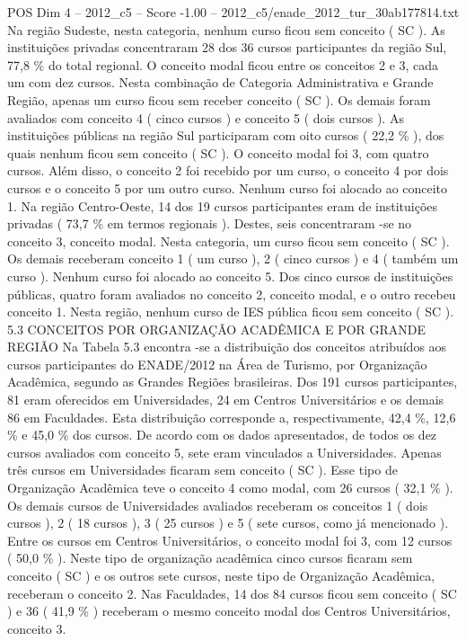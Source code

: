 \begin{textsample}{POS Dim 4 – 2012\_c5 – Score -1.00 – 2012\_c5/enade\_2012\_tur\_30ab177814.txt}
Na região Sudeste, nesta categoria, nenhum curso ficou sem conceito ( SC ).
As instituições privadas concentraram 28 dos 36 cursos participantes da região Sul, 77,8 \% do total regional.
O conceito modal ficou entre os conceitos 2 e 3, cada um com dez cursos.
Nesta combinação de Categoria Administrativa e Grande Região, apenas um curso ficou sem receber conceito ( SC ).
Os demais foram avaliados com conceito 4 ( cinco cursos ) e conceito 5 ( dois cursos ).
As instituições públicas na região Sul participaram com oito cursos ( 22,2 \% ), dos quais nenhum ficou sem conceito ( SC ).
O conceito modal foi 3, com quatro cursos.
Além disso, o conceito 2 foi recebido por um curso, o conceito 4 por dois cursos e o conceito 5 por um outro curso.
Nenhum curso foi alocado ao conceito 1.
Na região Centro-Oeste, 14 dos 19 cursos participantes eram de instituições privadas ( 73,7 \% em termos regionais ).
Destes, seis concentraram -se no conceito 3, conceito modal.
Nesta categoria, um curso ficou sem conceito ( SC ).
Os demais receberam conceito 1 ( um curso ), 2 ( cinco cursos ) e 4 ( também um curso ).
Nenhum curso foi alocado ao conceito 5.
Dos cinco cursos de instituições públicas, quatro foram avaliados no conceito 2, conceito modal, e o outro recebeu conceito 1.
Nesta região, nenhum curso de IES pública ficou sem conceito ( SC ). 5.3 CONCEITOS POR ORGANIZAÇÃO ACADÊMICA E POR GRANDE REGIÃO Na Tabela 5.3 encontra -se a distribuição dos conceitos atribuídos aos cursos participantes do ENADE/2012 na Área de Turismo, por Organização Acadêmica, segundo as Grandes Regiões brasileiras.
Dos 191 cursos participantes, 81 eram oferecidos em Universidades, 24 em Centros Universitários e os demais 86 em Faculdades.
Esta distribuição corresponde a, respectivamente, 42,4 \%, 12,6 \% e 45,0 \% dos cursos.
De acordo com os dados apresentados, de todos os dez cursos avaliados com conceito 5, sete eram vinculados a Universidades.
Apenas três cursos em Universidades ficaram sem conceito ( SC ).
Esse tipo de Organização Acadêmica teve o conceito 4 como modal, com 26 cursos ( 32,1 \% ).
Os demais cursos de Universidades avaliados receberam os conceitos 1 ( dois cursos ), 2 ( 18 cursos ), 3 ( 25 cursos ) e 5 ( sete cursos, como já mencionado ).
Entre os cursos em Centros Universitários, o conceito modal foi 3, com 12 cursos ( 50,0 \% ).
Neste tipo de organização acadêmica cinco cursos ficaram sem conceito ( SC ) e os outros sete cursos, neste tipo de Organização Acadêmica, receberam o conceito 2.
Nas Faculdades, 14 dos 84 cursos ficou sem conceito ( SC ) e 36 ( 41,9 \% ) receberam o mesmo conceito modal dos Centros Universitários, conceito 3.

\end{textsample}
